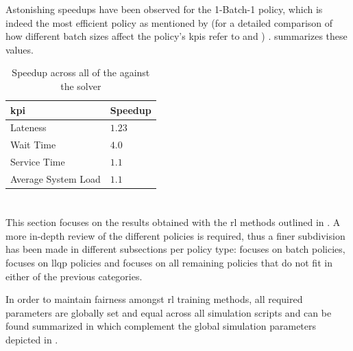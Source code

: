 \documentclass[draft=false]{seal_thesis}
\begin{document}

Astonishing speedups have been observed for the 1-Batch-1 policy, which is indeed the most efficient policy as mentioned by \citet{Zeng2005} (for a detailed comparison of how different batch sizes affect the policy's \glspl{kpi} refer to  and ) \citep[p. 24]{Zeng2005}.  summarizes these values.

\begin{table}[!ht]
\centering
\begin{tabular}{@{}ll@{}}
\toprule
\gls{kpi}                 & Speedup \\ \midrule
Lateness            & $1.23$             \\
Wait Time           & $4.0$             \\
Service Time        & $1.1$             \\
Average System Load & $1.1$             \\ \bottomrule
\end{tabular}
\caption{Speedup across all  of the  against the  solver}
\label{tab:opt_kpis_comp_gain}
\end{table}

\clearpage

\section{}
\label{sec:rl_results}

This section focuses on the results obtained with the \gls{rl} methods outlined in . A more in-depth review of the different policies is required, thus a finer subdivision has been made in different subsections per policy type:  focuses on batch policies,  focuses on \gls{llqp} policies and  focuses on all remaining policies that do not fit in either of the previous categories.

In order to maintain fairness amongst \gls{rl} training methods, all required parameters are globally set and equal across all simulation scripts and can be found summarized in  which complement the global simulation parameters depicted in .
\end{document}
